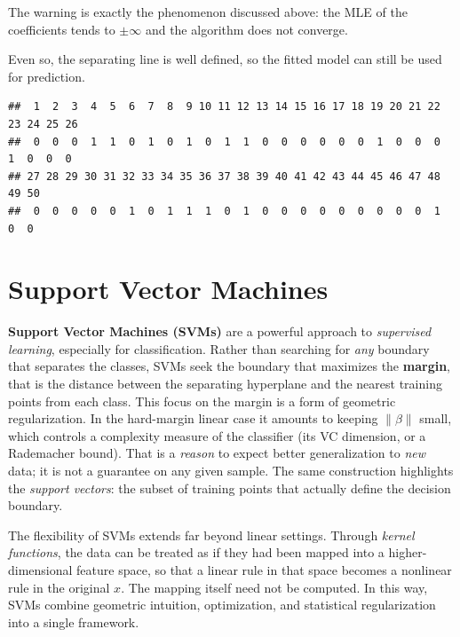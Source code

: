 \documentclass[
]{book}
\newenvironment{Shaded}{\begin{snugshade}}{\end{snugshade}}
\newcommand{\DecValTok}[1]{\textcolor[rgb]{0.00,0.00,0.81}{#1}}
\newcommand{\FunctionTok}[1]{\textcolor[rgb]{0.13,0.29,0.53}{\textbf{#1}}}
\newcommand{\NormalTok}[1]{#1}
\newcommand{\SpecialCharTok}[1]{\textcolor[rgb]{0.81,0.36,0.00}{\textbf{#1}}}
\begin{document}
The warning is exactly the phenomenon discussed above: the MLE of the coefficients tends to \(\pm\infty\) and the algorithm does not converge.

Even so, the separating line is well defined, so the fitted model can still be used for prediction.

\begin{Shaded}
\end{Shaded}

\begin{verbatim}
##  1  2  3  4  5  6  7  8  9 10 11 12 13 14 15 16 17 18 19 20 21 22 23 24 25 26 
##  0  0  0  1  1  0  1  0  1  0  1  1  0  0  0  0  0  0  1  0  0  0  1  0  0  0 
## 27 28 29 30 31 32 33 34 35 36 37 38 39 40 41 42 43 44 45 46 47 48 49 50 
##  0  0  0  0  0  1  0  1  1  1  0  1  0  0  0  0  0  0  0  0  0  1  0  0
\end{verbatim}

\chapter{Support Vector Machines}\label{support-vector-machines}

\textbf{Support Vector Machines (SVMs)} are a powerful approach to \emph{supervised learning}, especially for classification. Rather than searching for \emph{any} boundary that separates the classes, SVMs seek the boundary that maximizes the \textbf{margin}, that is the distance between the separating hyperplane and the nearest training points from each class. This focus on the margin is a form of geometric regularization. In the hard-margin linear case it amounts to keeping \(\|\beta\|\) small, which controls a complexity measure of the classifier (its VC dimension, or a Rademacher bound). That is a \emph{reason} to expect better generalization to \emph{new} data; it is not a guarantee on any given sample. The same construction highlights the \emph{support vectors}: the subset of training points that actually define the decision boundary.

The flexibility of SVMs extends far beyond linear settings. Through \emph{kernel functions}, the data can be treated as if they had been mapped into a higher-dimensional feature space, so that a linear rule in that space becomes a nonlinear rule in the original \(x\). The mapping itself need not be computed. In this way, SVMs combine geometric intuition, optimization, and statistical regularization into a single framework.
\end{document}
